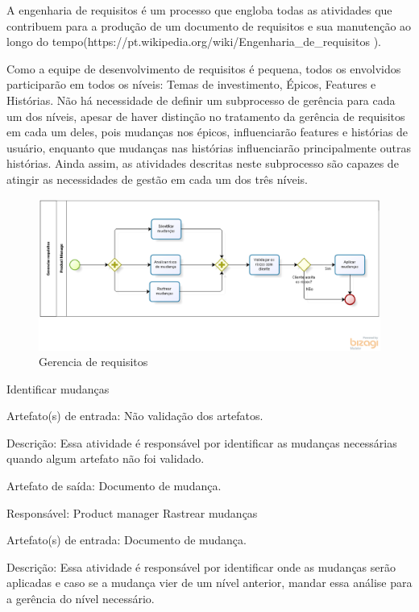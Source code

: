 A engenharia de requisitos é um processo que engloba todas as atividades que contribuem para a produção de um documento de requisitos e sua manutenção ao longo do tempo(https://pt.wikipedia.org/wiki/Engenharia\_de\_requisitos ).

Como a equipe de desenvolvimento de requisitos é pequena, todos os envolvidos participarão em todos os níveis: Temas de investimento, Épicos, Features e Histórias. Não há necessidade de definir um subprocesso de gerência para cada um dos níveis, apesar de haver distinção no tratamento da gerência de requisitos em cada um deles, pois mudanças nos épicos, influenciarão features e histórias de usuário, enquanto que mudanças nas histórias influenciarão principalmente outras histórias. Ainda assim, as atividades descritas neste subprocesso são capazes de atingir as necessidades de gestão em cada um dos três níveis.

\begin{figure}[H]
    \centering
    \caption{Gerencia de requisitos}
    \label{processoGerencia}
    \includegraphics[keepaspectratio=true,scale=0.5]{figuras/processoGerencia.eps}
\end{figure}

Identificar mudanças 

Artefato(s) de entrada: Não validação dos artefatos.

Descrição: Essa atividade é responsável por identificar as mudanças necessárias quando algum artefato não foi validado.

Artefato de saída: Documento de mudança.

Responsável: Product manager
Rastrear mudanças

Artefato(s) de entrada: Documento de mudança.

Descrição: Essa atividade é responsável por identificar onde as mudanças serão aplicadas e caso se a mudança vier de um nível anterior, mandar essa análise para a gerência do nível necessário.

